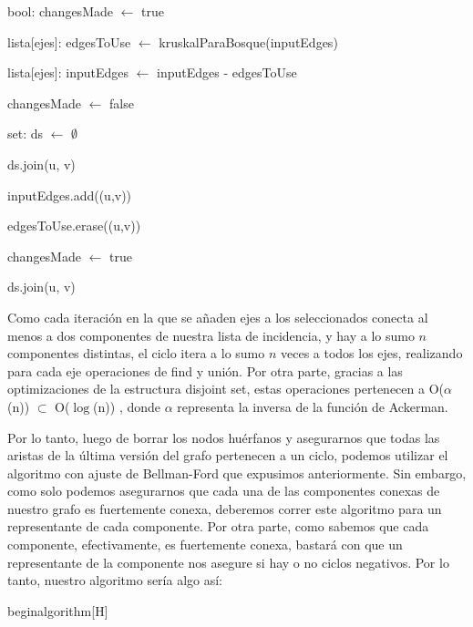 \begin{algorithm}[H]
		\NoCaptionOfAlgo
		\caption{}
		
		bool: changesMade $\leftarrow$ true
		
		lista[ejes]: edgesToUse $\leftarrow$ kruskalParaBosque(inputEdges)

		lista[ejes]: inputEdges $\leftarrow$ inputEdges - edgesToUse

		{
			changesMade $\leftarrow$ false

			set: ds $\leftarrow$ $\emptyset$

			{
				ds.join(u, v)
			}

			{
					{
						inputEdges.add((u,v))

						edgesToUse.erase((u,v))

						changesMade $\leftarrow$ true
					}
					{
						ds.join(u, v)
					}
			}



		}
	\end{algorithm}
	
\par
Como cada iteración en la que se añaden ejes a los seleccionados conecta al menos a dos componentes de nuestra lista de incidencia, y hay a lo sumo $n$ componentes distintas, el ciclo itera a lo sumo $n$ veces a todos los ejes, realizando para cada eje operaciones de find y unión. Por otra parte, gracias a las optimizaciones de la estructura disjoint set, estas operaciones pertenecen a O($\alpha$(n)) $\subset$ O($\log$(n)) , donde $\alpha$ representa la inversa de la función de Ackerman.
\\
\par
Por lo tanto, luego de borrar los nodos huérfanos y asegurarnos que todas las aristas de la última versión del grafo pertenecen a un ciclo, podemos utilizar el algoritmo con ajuste de Bellman-Ford que expusimos anteriormente. Sin embargo, como solo podemos asegurarnos que cada una de las componentes conexas de nuestro grafo es fuertemente conexa, deberemos correr este algoritmo para un representante de cada componente. Por otra parte, como sabemos que cada componente, efectivamente, es fuertemente conexa, bastará con que un representante de la componente nos asegure si hay o no ciclos negativos. Por lo tanto, nuestro algoritmo sería algo así:

begin{algorithm}[H]
		\NoCaptionOfAlgo
		\caption{}
		
